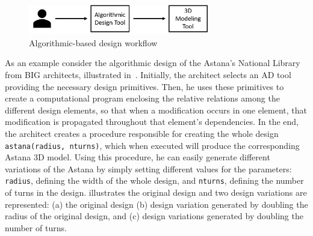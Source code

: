 \begin{figure}[htbp]
\centering
\includegraphics[width=0.70\textwidth]{./Images/Introduction/AlgorithmicArchitecturalDesign.png}
\caption[General view of the Algorithmic Design Approach]{Algorithmic-based design workflow}
\label{fig:algorithmicdesign}
\end{figure}
	
	As an example consider the  algorithmic design of the Astana's National Library from BIG architects, illustrated in~. Initially, the architect selects an \ac{AD} tool providing the necessary design primitives. Then, he uses these primitives to create a computational program enclosing the relative relations among the different design elements, so that when a modification occurs in one element, that modification is propagated throughout that element's dependencies. In the end, the architect creates a procedure responsible for creating the whole design \texttt{astana(radius, nturns)}, which when executed will produce the corresponding Astana 3D model. Using this procedure, he can easily generate different variations of the Astana by simply setting different values for the parameters: \texttt{radius}, defining the width of the whole design, and \texttt{nturns}, defining the number of turns in the design.  illustrates the original design and two design variations are represented: (a) the original design (b) design variation generated by doubling the radius of the original design, and (c) design variations generated by doubling the number of turns.
	
